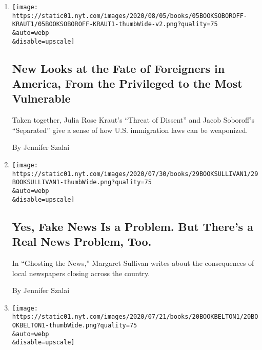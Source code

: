 \begin{enumerate}
\def\labelenumi{\arabic{enumi}.}
\item
  \href{/2020/07/30/books/review-threat-dissent-julia-rose-kraut-separated-jacob-soboroff.html}{}

  \texttt{[image: https://static01.nyt.com/images/2020/08/05/books/05BOOKSOBOROFF-KRAUT1/05BOOKSOBOROFF-KRAUT1-thumbWide-v2.png?quality=75\\\&auto=webp\\\&disable=upscale]}

  \hypertarget{new-looks-at-the-fate-of-foreigners-in-america-from-the-privileged-to-the-most-vulnerable}{%
  \subsection{New Looks at the Fate of Foreigners in America, From the
  Privileged to the Most
  Vulnerable}\label{new-looks-at-the-fate-of-foreigners-in-america-from-the-privileged-to-the-most-vulnerable}}

  Taken together, Julia Rose Kraut's ``Threat of Dissent'' and Jacob
  Soboroff's ``Separated'' give a sense of how U.S. immigration laws can
  be weaponized.

  By Jennifer Szalai
\item
  \href{/2020/07/26/books/review-ghosting-news-local-journalism-democracy-crisis-margaret-sullivan.html}{}

  \texttt{[image: https://static01.nyt.com/images/2020/07/30/books/29BOOKSULLIVAN1/29BOOKSULLIVAN1-thumbWide.png?quality=75\\\&auto=webp\\\&disable=upscale]}

  \hypertarget{yes-fake-news-is-a-problem-but-theres-a-real-news-problem-too}{%
  \subsection{Yes, Fake News Is a Problem. But There's a Real News
  Problem,
  Too.}\label{yes-fake-news-is-a-problem-but-theres-a-real-news-problem-too}}

  In ``Ghosting the News,'' Margaret Sullivan writes about the
  consequences of local newspapers closing across the country.

  By Jennifer Szalai
\item
  \href{/2020/07/16/books/review-putins-people-kgb-catherine-belton.html}{}

  \texttt{[image: https://static01.nyt.com/images/2020/07/21/books/20BOOKBELTON1/20BOOKBELTON1-thumbWide.png?quality=75\\\&auto=webp\\\&disable=upscale]}

  \hypertarget{putins-people-documents-the-ruthless-and-relentless-reach-of-kremlin-corruption}{%
}
\end{enumerate}
